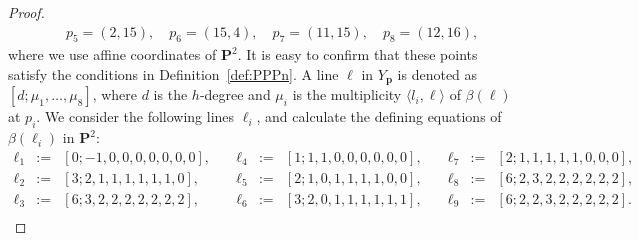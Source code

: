 \documentclass{math}
\theoremstyle{plain}
\numberwithin{equation}{section}
\newcommand{\intf}[1]{\langle #1 \rangle}
\newcommand{\bfP}{\mathbf{P}}
\newcommand{\bp}{\bm{p}}
\begin{document}
\begin{proof}
\[\begin{aligned}
\quad
&p_5=(2,15),
\quad
p_6=(15,4),
\quad
p_7=(11,15),
\quad
p_8=(12, 16),
\end{aligned}
 \]
where we use  affine coordinates of ${\bfP}^{2}$.
It is easy to confirm that these points 
satisfy  the conditions in Definition~\ref{def:PPPn}.
A line $\ell$ in $Y_{\bp}$ is denoted as $[d; \mu_1, \dots, \mu_8]$,
where
$d$ is the $h$-degree and $\mu_i$ is the multiplicity $\intf{l_i, \ell}$ of $\beta(\ell)$ at $p_i$.
We consider the following lines ${\ell}_i$, and calculate the defining equations of $\beta({\ell}_i)$ in ${\bfP}^{2}$:
\[
\begin{array}{lcl}
{\ell}_1 &:=& [0;  -1, 0, 0, 0, 0, 0, 0, 0 ], \\ %
{\ell}_2 &:=& [3;  2, 1, 1, 1, 1, 1, 1, 0 ], \\ %
{\ell}_3 &:=& [6;  3, 2, 2, 2, 2, 2, 2, 2 ], \\  %
\end{array}
\quad
\begin{array}{lcl}
{\ell}_4 &:=& [1; 1, 1, 0, 0, 0, 0, 0, 0 ], \\ %
{\ell}_5 &:=& [2; 1, 0, 1, 1, 1, 1, 0, 0 ], \\ %
{\ell}_6 &:=& [3; 2, 0, 1, 1, 1, 1, 1, 1 ], \\ %
\end{array}
%
\quad
\begin{array}{lcl}
{\ell}_7 &:=& [2; 1, 1, 1, 1, 1, 0, 0, 0 ], \\%
{\ell}_8 &:=& [6; 2, 3, 2, 2, 2, 2, 2, 2 ], \\%
{\ell}_9 &:=& [6; 2, 2, 3, 2, 2, 2, 2, 2 ]. \\%
\end{array}
\]

\end{proof}
\end{document}
